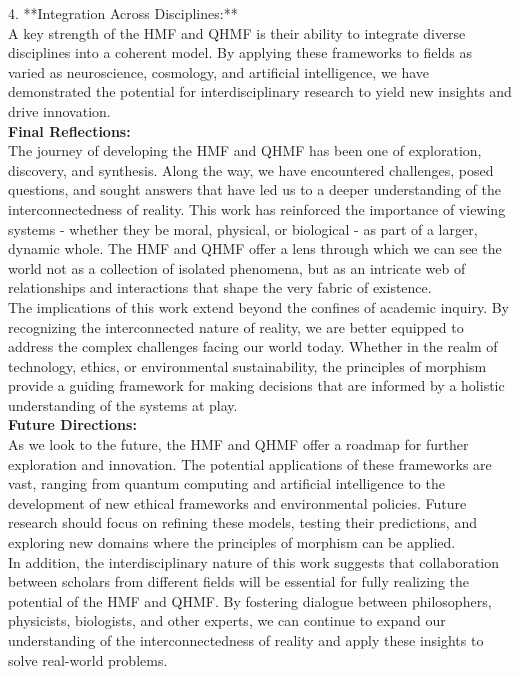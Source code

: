 \documentclass{article}
\begin{document}
4. **Integration Across Disciplines:**
\\

   A key strength of the HMF and QHMF is their ability to integrate diverse disciplines into a coherent model. By applying these frameworks to fields as varied as neuroscience, cosmology, and artificial intelligence, we have demonstrated the potential for interdisciplinary research to yield new insights and drive innovation.
\\

\textbf{Final Reflections:}
\\

The journey of developing the HMF and QHMF has been one of exploration, discovery, and synthesis. Along the way, we have encountered challenges, posed questions, and sought answers that have led us to a deeper understanding of the interconnectedness of reality. This work has reinforced the importance of viewing systems - whether they be moral, physical, or biological - as part of a larger, dynamic whole. The HMF and QHMF offer a lens through which we can see the world not as a collection of isolated phenomena, but as an intricate web of relationships and interactions that shape the very fabric of existence.
\\

The implications of this work extend beyond the confines of academic inquiry. By recognizing the interconnected nature of reality, we are better equipped to address the complex challenges facing our world today. Whether in the realm of technology, ethics, or environmental sustainability, the principles of morphism provide a guiding framework for making decisions that are informed by a holistic understanding of the systems at play.
\\

\textbf{Future Directions:}
\\

As we look to the future, the HMF and QHMF offer a roadmap for further exploration and innovation. The potential applications of these frameworks are vast, ranging from quantum computing and artificial intelligence to the development of new ethical frameworks and environmental policies. Future research should focus on refining these models, testing their predictions, and exploring new domains where the principles of morphism can be applied.
\\

In addition, the interdisciplinary nature of this work suggests that collaboration between scholars from different fields will be essential for fully realizing the potential of the HMF and QHMF. By fostering dialogue between philosophers, physicists, biologists, and other experts, we can continue to expand our understanding of the interconnectedness of reality and apply these insights to solve real-world problems.
\\
\end{document}
